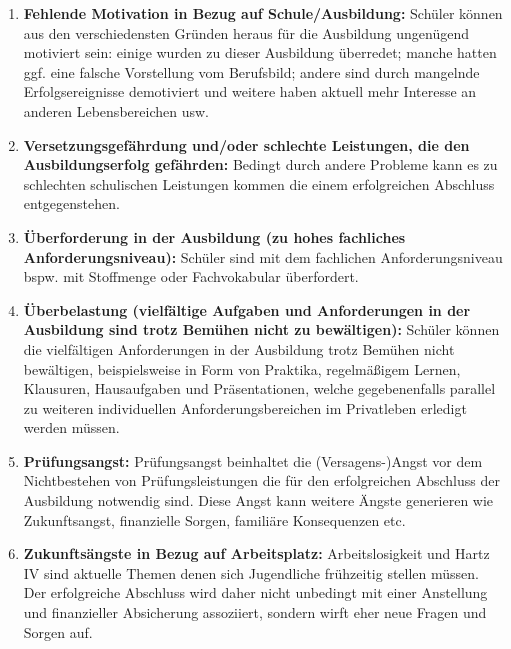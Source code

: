 \begin{enumerate}
	\item \textbf{Fehlende Motivation in Bezug auf Schule/Ausbildung:} Schüler können aus den verschiedensten Gründen heraus für die Ausbildung ungenügend motiviert sein: einige wurden zu dieser Ausbildung überredet; manche hatten ggf. eine falsche Vorstellung vom Berufsbild; andere sind durch mangelnde Erfolgsereignisse demotiviert und weitere haben aktuell mehr Interesse an anderen Lebensbereichen usw.
	\item \textbf{Versetzungsgefährdung und/oder schlechte Leistungen, die den Ausbildungserfolg gefährden:} Bedingt durch andere Probleme kann es zu schlechten schulischen Leistungen kommen die einem erfolgreichen Abschluss entgegenstehen. 
	\item \textbf{Überforderung in der Ausbildung (zu hohes fachliches Anforderungsniveau):} Schüler sind mit dem fachlichen Anforderungsniveau bspw. mit Stoffmenge oder Fachvokabular überfordert.
	\item \textbf{Überbelastung (vielfältige Aufgaben und Anforderungen in der Ausbildung sind trotz Bemühen nicht zu bewältigen):} Schüler können die vielfältigen Anforderungen in der Ausbildung trotz Bemühen nicht bewältigen, beispielsweise in Form von Praktika, regelmäßigem Lernen, Klausuren, Hausaufgaben und Präsentationen, welche gegebenenfalls parallel zu weiteren individuellen Anforderungsbereichen im Privatleben erledigt werden müssen.
	\item \textbf{Prüfungsangst:} Prüfungsangst beinhaltet die (Versagens-)Angst vor dem Nichtbestehen von Prüfungsleistungen die für den erfolgreichen Abschluss der Ausbildung notwendig sind. Diese Angst kann weitere Ängste generieren wie Zukunftsangst, finanzielle Sorgen, familiäre Konsequenzen etc.
	\item \textbf{Zukunftsängste in Bezug auf Arbeitsplatz:} Arbeitslosigkeit und Hartz IV sind aktuelle Themen denen sich Jugendliche frühzeitig stellen müssen. Der erfolgreiche Abschluss wird daher nicht unbedingt mit einer Anstellung und finanzieller Absicherung assoziiert, sondern wirft eher neue Fragen und Sorgen auf.
\end{enumerate}

